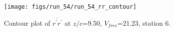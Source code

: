 \begin{figure}[H]
\centering
\texttt{[image: figs/run\_54/run\_54\_rr\_contour]}
\caption{Contour plot of $\overline{r^\prime r^\prime}$ at $z/c$=9.50, $V_{free}$=21.23, station 6.}
\end{figure}


